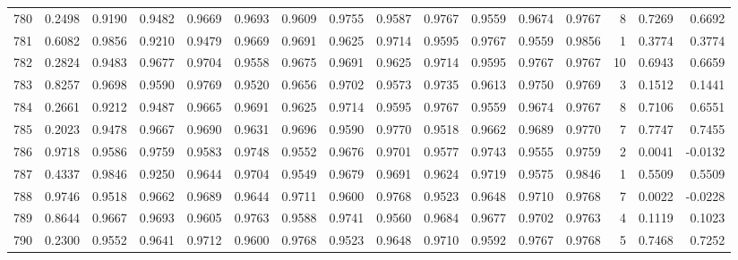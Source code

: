\begin{tabular}{lrrrrrrrrrrrrrrr}
780 &      0.2498 &  0.9190 &  0.9482 &  0.9669 &  0.9693 &  0.9609 &  0.9755 &  0.9587 &  0.9767 &  0.9559 &   0.9674 &     0.9767 &      8 &                    0.7269 &                     0.6692 \\
781 &      0.6082 &  0.9856 &  0.9210 &  0.9479 &  0.9669 &  0.9691 &  0.9625 &  0.9714 &  0.9595 &  0.9767 &   0.9559 &     0.9856 &      1 &                    0.3774 &                     0.3774 \\
782 &      0.2824 &  0.9483 &  0.9677 &  0.9704 &  0.9558 &  0.9675 &  0.9691 &  0.9625 &  0.9714 &  0.9595 &   0.9767 &     0.9767 &     10 &                    0.6943 &                     0.6659 \\
783 &      0.8257 &  0.9698 &  0.9590 &  0.9769 &  0.9520 &  0.9656 &  0.9702 &  0.9573 &  0.9735 &  0.9613 &   0.9750 &     0.9769 &      3 &                    0.1512 &                     0.1441 \\
784 &      0.2661 &  0.9212 &  0.9487 &  0.9665 &  0.9691 &  0.9625 &  0.9714 &  0.9595 &  0.9767 &  0.9559 &   0.9674 &     0.9767 &      8 &                    0.7106 &                     0.6551 \\
785 &      0.2023 &  0.9478 &  0.9667 &  0.9690 &  0.9631 &  0.9696 &  0.9590 &  0.9770 &  0.9518 &  0.9662 &   0.9689 &     0.9770 &      7 &                    0.7747 &                     0.7455 \\
786 &      0.9718 &  0.9586 &  0.9759 &  0.9583 &  0.9748 &  0.9552 &  0.9676 &  0.9701 &  0.9577 &  0.9743 &   0.9555 &     0.9759 &      2 &                    0.0041 &                    -0.0132 \\
787 &      0.4337 &  0.9846 &  0.9250 &  0.9644 &  0.9704 &  0.9549 &  0.9679 &  0.9691 &  0.9624 &  0.9719 &   0.9575 &     0.9846 &      1 &                    0.5509 &                     0.5509 \\
788 &      0.9746 &  0.9518 &  0.9662 &  0.9689 &  0.9644 &  0.9711 &  0.9600 &  0.9768 &  0.9523 &  0.9648 &   0.9710 &     0.9768 &      7 &                    0.0022 &                    -0.0228 \\
789 &      0.8644 &  0.9667 &  0.9693 &  0.9605 &  0.9763 &  0.9588 &  0.9741 &  0.9560 &  0.9684 &  0.9677 &   0.9702 &     0.9763 &      4 &                    0.1119 &                     0.1023 \\
790 &      0.2300 &  0.9552 &  0.9641 &  0.9712 &  0.9600 &  0.9768 &  0.9523 &  0.9648 &  0.9710 &  0.9592 &   0.9767 &     0.9768 &      5 &                    0.7468 &                     0.7252 \\

\end{tabular}
